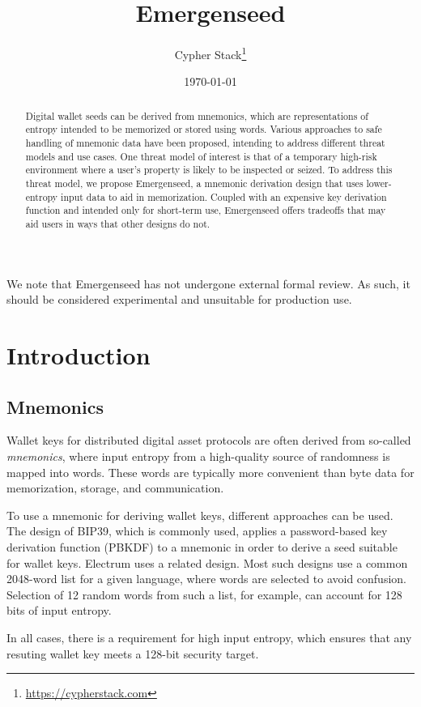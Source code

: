 \documentclass{article}
\title{Emergenseed}
\author{Cypher Stack\thanks{\url{https://cypherstack.com}}}
\date{\today}
\begin{document}
\maketitle

\begin{abstract}
	Digital wallet seeds can be derived from mnemonics, which are representations of entropy intended to be memorized or stored using words.
	Various approaches to safe handling of mnemonic data have been proposed, intending to address different threat models and use cases.
	One threat model of interest is that of a temporary high-risk environment where a user's property is likely to be inspected or seized.
	To address this threat model, we propose Emergenseed, a mnemonic derivation design that uses lower-entropy input data to aid in memorization.
	Coupled with an expensive key derivation function and intended only for short-term use, Emergenseed offers tradeoffs that may aid users in ways that other designs do not.
\end{abstract}

We note that Emergenseed has not undergone external formal review.
As such, it should be considered experimental and unsuitable for production use.


\section{Introduction}

\subsection{Mnemonics}

Wallet keys for distributed digital asset protocols are often derived from so-called \textit{mnemonics}, where input entropy from a high-quality source of randomness is mapped into words.
These words are typically more convenient than byte data for memorization, storage, and communication.

To use a mnemonic for deriving wallet keys, different approaches can be used.
The design of BIP39, which is commonly used, applies a password-based key derivation function (PBKDF) to a mnemonic in order to derive a seed suitable for wallet keys.
Electrum uses a related design.
Most such designs use a common 2048-word list for a given language, where words are selected to avoid confusion.
Selection of 12 random words from such a list, for example, can account for 128 bits of input entropy.

In all cases, there is a requirement for high input entropy, which ensures that any resuting wallet key meets a 128-bit security target.
\end{document}
